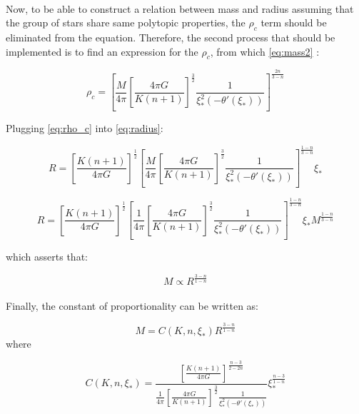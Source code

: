 \documentclass[letterpaper,12pt]{article}
\begin{document}
\paragraph{} Now, to be able to construct a relation between mass and radius assuming that the group of stars share same polytopic properties, the $\rho_c$ term should be eliminated from the equation. Therefore, the second process that should be implemented is to find an expression for the $\rho_c$, from which \eqref{eq:mass2} :

\begin{equation}
    \label{eq:rho_c}
    \rho_c = \left[\frac{M}{4 \pi} \left[\frac{4 \pi G}{K \left(n+1\right)}\right]^{\frac{3}{2}}  \frac{1}{\xi_*^2\left(-\theta'(\xi_*)\right)}\right]^{\frac{2n}{3-n}}
\end{equation}

Plugging \eqref{eq:rho_c} into \eqref{eq:radius}:

\begin{equation*}
    R = \left[\frac{K \left(n+1\right)}{4 \pi G}\right]^{\frac{1}{2}} \left[\frac{M}{4 \pi} \left[\frac{4 \pi G}{K \left(n+1\right)}\right]^{\frac{3}{2}}  \frac{1}{\xi_*^2\left(-\theta'(\xi_*)\right)}\right]^{\frac{1-n}{3-n}} \xi_* 
\end{equation*}

\begin{equation*}
    R =  \left[\frac{K \left(n+1\right)}{4 \pi G}\right]^{\frac{1}{2}} \left[\frac{1}{4 \pi} \left[\frac{4 \pi G}{K \left(n+1\right)}\right]^{\frac{3}{2}}  \frac{1}{\xi_*^2\left(-\theta'(\xi_*)\right)}\right]^{\frac{1-n}{3-n}} \xi_* M^{\frac{1-n}{3-n}} 
\end{equation*}

which asserts that:

\begin{equation*}
    M \propto R^{\frac{3-n}{1-n}}
\end{equation*}

\paragraph{} Finally, the constant of proportionality can be written as:

\begin{equation}
    \label{eq:mass-radius-prop}
    M = C(K, n, \xi_*) R^{\frac{3-n}{1-n}} 
\end{equation}
where 

\begin{equation}
    \label{eq:const-prop}
  \boxed{  C(K, n, \xi_*) = \frac{ \left[\frac{K \left(n+1\right)}{4 \pi G}\right]^{\frac{n-3}{2 - 2n}} }{\frac{1}{4 \pi} \left[\frac{4 \pi G}{K \left(n+1\right)}\right]^{\frac{3}{2}}  \frac{1}{\xi_*^2\left(-\theta'(\xi_*)\right)}} \xi_*^{\frac{n-3}{1-n}} }
\end{equation}
\end{document}

